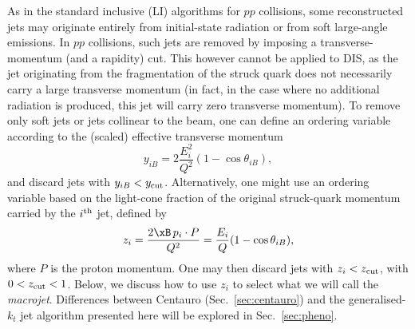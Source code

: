 As in the standard inclusive (LI) algorithms for $pp$ collisions, some
reconstructed jets may originate entirely from initial-state radiation
or from soft large-angle emissions.
%
In $pp$ collisions, such jets are removed by imposing a
transverse-momentum (and a rapidity) cut.
%
This however cannot be applied to DIS, as the jet originating from the
fragmentation of the struck quark does not necessarily carry a large
transverse momentum (in fact, in the case where no additional
radiation is produced, this jet will carry zero transverse momentum).
%
To remove only soft jets or jets collinear to the beam, one can define
an ordering variable according to the (scaled) effective transverse
momentum
\begin{equation}
  y_{iB} = 2\frac{E_i^2 }{Q^2}(1-\cos\theta_{iB}),
\end{equation}
and discard jets with $y_{iB} < y_{\rm cut}$. 
%
Alternatively, one might use an ordering variable based on the light-cone
fraction of the original struck-quark momentum carried by the $i^{\rm
  th}$ jet, defined by 
\begin{equation}
  z_{i} =  \frac{2 \xB\, p_i \cdot P}{Q^2} = \frac{E_i}{Q}(1-\cos\theta_{iB}),\label{eq:zi}
\end{equation}
where $P$ is the proton momentum. One may then discard jets with $z_i
< z_{\rm cut}$, with $0<z_{\rm cut}<1$. Below, we discuss how to use
$z_i$ to select what we will call the \emph{macrojet}. 
%
Differences between Centauro (Sec.~\ref{sec:centauro}) and the
generalised-$k_t$ jet algorithm presented here will be explored in
Sec.~\ref{sec:pheno}.


